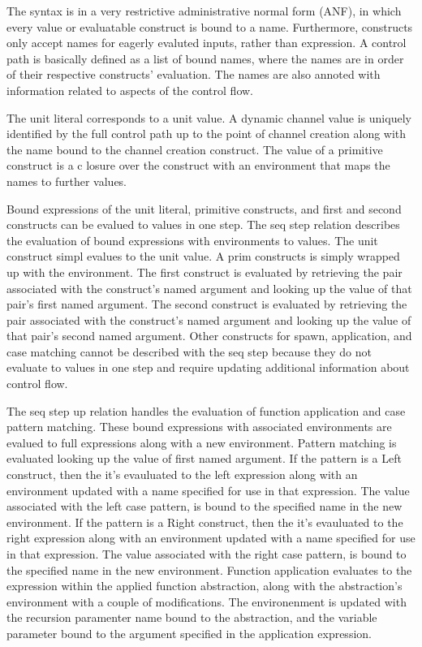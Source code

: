 \documentclass{article}
\begin{document}
The syntax is in a very restrictive administrative normal form (ANF), in which every value or evaluatable construct is bound to a
name.  Furthermore, constructs only accept names for eagerly evaluted inputs, rather than expression.  A control path is basically
defined as a list of bound names, where the names are in order of their respective constructs' evaluation. The names are also annoted with information related to aspects of the control flow.

The unit literal corresponds to a unit value. A dynamic channel value is uniquely identified by the full control path up to the
point of channel creation along with the name bound to the channel creation construct. The value of a primitive construct is a c
losure over the construct with an environment that maps the names to further values.

Bound expressions of the unit literal, primitive constructs, and first and second constructs can be evalued to values in one step.  The seq step relation describes the evaluation of bound expressions with environments to values.  The unit construct simpl evalues
to the unit value.  A prim constructs is simply wrapped up with the environment.  The first construct is evaluated by retrieving
the pair associated with the construct's named argument and looking up the value of that pair's first named argument. The second
construct is evaluated by retrieving the pair associated with the construct's named argument and looking up the value of that pair's
second named argument.  Other constructs for spawn, application, and case matching cannot be described with the seq step because
they do not evaluate to values in one step and require updating additional information about control flow. 

The seq step up relation handles the evaluation of function application and case pattern matching.  These bound expressions with
associated environments are evalued to full expressions along with a new environment.  Pattern matching is evaluated looking up the
value of first named argument.  If the pattern is a Left construct, then the it's evauluated to the left expression along with an
environment updated with a name specified for use in that expression.  The value associated with the left case pattern, is bound to
the specified name in the new environment. If the pattern is a Right construct, then the it's evauluated to the right expression
along with an environment updated with a name specified for use in that expression.  The value associated with the right case
pattern, is bound to the specified name in the new environment. Function application evaluates to the expression within the applied function abstraction, along with the abstraction's environment with a couple of modifications.  The environenment is updated with the recursion paramenter name bound to the abstraction, and the variable parameter bound to the argument specified in the application expression. 
\end{document}
